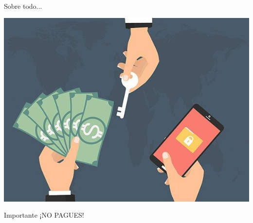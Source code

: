 \documentclass[10pt]{beamer}
\begin{document}
\begin{frame}[fragile]{Sobre todo...}
	\begin{center}
		\includegraphics[scale=0.5]{./Imagenes/ransomware9.jpg}
	\end{center}
	\pause
	\begin{alertblock}{Importante}
		¡NO PAGUES!
	\end{alertblock}
\end{frame}
\end{document}
